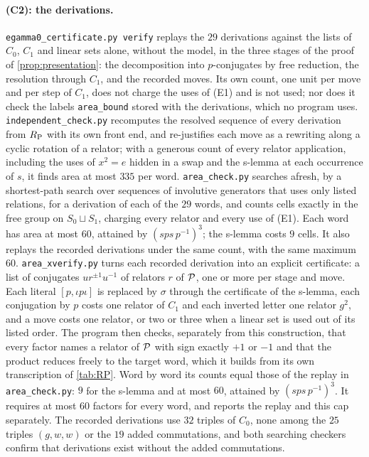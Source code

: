 \paragraph{(C2): the derivations.} \texttt{egamma0\_certificate.py verify} replays the $29$ derivations against the lists of $C_0$, $C_1$ and
linear sets alone, without the model, in the three stages of the proof of \cref{prop:presentation}: the decomposition into $p$-conjugates
by free reduction, the resolution through $C_1$, and the recorded moves. Its own count, one unit per move and per step of $C_1$, does not
charge the uses of (E1) and is not used; nor does it check the labels \texttt{area\_bound} stored with the derivations, which no program
uses. \texttt{independent\_check.py} recomputes the resolved sequence of every derivation from $R_{\mathrm P}$ with
its own front end, and re-justifies each move as a rewriting along a cyclic rotation of a relator; with a generous count of every relator
application, including the uses of $x^2=e$ hidden in a swap and the s-lemma at each occurrence of $s$, it finds area at most $335$ per word.
\texttt{area\_check.py} searches afresh, by a shortest-path search over sequences of involutive generators that uses only listed relations,
for a derivation of each of the $29$ words, and counts cells exactly in the free group on $S_0\sqcup S_1$, charging every relator and every
use of (E1). Each word has area at most $60$, attained by $(sps\,p^{-1})^3$; the s-lemma costs $9$ cells. It also replays the recorded
derivations under the same count, with the same maximum $60$. \texttt{area\_xverify.py} turns each recorded derivation into an explicit
certificate: a list of conjugates $ur^{\pm1}u^{-1}$ of relators $r$ of $\mathcal P$, one or more per stage and move. Each literal
$[p,\iota p\iota]$ is replaced by $\sigma$ through the certificate of the s-lemma, each conjugation by $p$ costs one relator of $C_1$ and
each inverted letter one relator $g^2$, and a move costs one relator, or two or three when a linear set is used out of its listed order.
The program then checks, separately from this construction, that every factor names a relator of $\mathcal P$ with sign exactly $+1$ or $-1$
and that the product reduces freely to the target word, which it builds from its own transcription of \cref{tab:RP}. Word by word its
counts equal those of the replay in \texttt{area\_check.py}: $9$ for the s-lemma and at most $60$, attained by $(sps\,p^{-1})^3$. It
requires at most $60$ factors for every word, and reports the replay and this cap separately. The recorded derivations use $32$ triples of
$C_0$, none among the $25$ triples $(g,w,w)$ or the $19$ added commutations, and both searching checkers confirm that derivations exist
without the added commutations.

